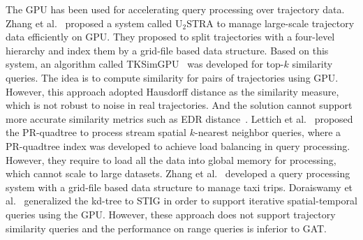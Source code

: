 \documentclass[10pt,conference,letterpaper]{IEEEtran}
\newcommand{\frname}{GAT\xspace }
\begin{document}
\vspace{0.1cm}{\bf GPU-based trajectory query processing.}
%
The GPU has been used for accelerating query processing over trajectory data. Zhang et al.~\cite{Zhang:2012:USH} proposed a system called U$_2$STRA to manage large-scale trajectory data efficiently on GPU. They proposed to split trajectories with a four-level hierarchy and index them by a grid-file based data structure. Based on this system, an algorithm called TKSimGPU~\cite{DBLP:conf/bigdataconf/LealGZY15} was developed for top-$k$ similarity queries. The idea is to compute similarity for pairs of trajectories using GPU.
However, this approach adopted Hausdorff distance as the similarity measure, which is not robust to noise in real trajectories. And the solution cannot support more accurate similarity metrics such as EDR distance~\cite{DBLP:conf/sigmod/ChenOO05}.
%
Lettich et al.~\cite{DBLP:conf/gis/LettichOS15} proposed the PR-quadtree to process stream spatial $k$-nearest neighbor queries, where a PR-quadtree index was developed to achieve load balancing in query processing. 
However, they require to load all the data into global memory for processing, which cannot scale to large datasets.
Zhang et al.~\cite{GPUTaxi} developed a query processing system with a grid-file based data structure to manage taxi trips.
Doraiswamy et al.~\cite{7498315} generalized the kd-tree to STIG in order to support iterative spatial-temporal queries using the GPU. 
However, these approach does not support trajectory similarity queries and the performance on range queries is inferior to GAT.  
\end{document}
